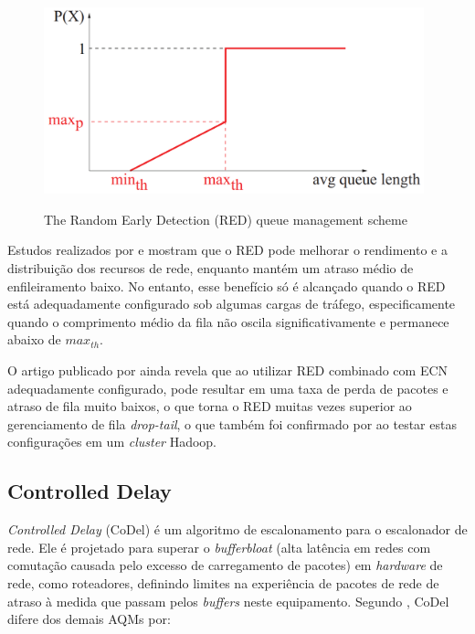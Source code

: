 \begin{figure}[htp]
    \centering
    \includegraphics[width=11cm]{2-fundam/REDScheme.PNG}
    \caption{The Random Early Detection (RED) queue management scheme}
    \cite{lochin2011managing}
    \label{fig:redscheme}
\end{figure}

Estudos realizados por \cite{floyd1993random} e \cite{rosolen1999red} mostram que o RED pode melhorar o rendimento e a distribuição dos recursos de rede, enquanto mantém um atraso médio de enfileiramento baixo. No entanto, esse benefício só é alcançado quando o RED está adequadamente configurado sob algumas cargas de tráfego, especificamente quando o comprimento médio da fila não oscila significativamente e permanece abaixo de {$\mathit{max}_\mathit{th}$}.

O artigo publicado por \cite{chung2002analysis} ainda revela que ao utilizar RED combinado com ECN adequadamente configurado, pode resultar em uma taxa de perda de pacotes e atraso de fila muito baixos, o que torna o RED muitas vezes superior ao gerenciamento de fila \emph{drop-tail}, o que também foi confirmado por \cite{silva2017interconnect} ao testar estas configurações em um \emph{cluster} Hadoop.


\subsection{Controlled Delay}

\emph{Controlled Delay} (CoDel) é um algoritmo de escalonamento para o escalonador de rede. Ele é projetado para superar o \emph{bufferbloat} (alta latência em redes com comutação causada pelo excesso de carregamento de pacotes) em \emph{hardware} de rede, como roteadores, definindo limites na experiência de pacotes de rede de atraso à medida que passam pelos \emph{buffers} neste equipamento. Segundo \cite{nichols2012controlling}, CoDel difere dos demais AQMs por:

